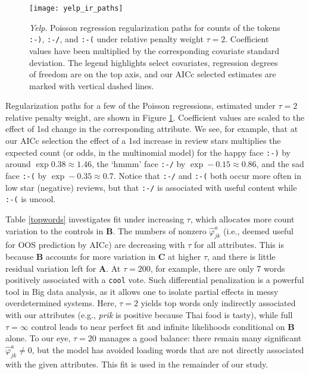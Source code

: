 \documentclass[12pt]{article}
\newcommand{\bm}[1]{\mathbf{#1}}
\newcommand{\cd}[1]{{\tt#1}}
\begin{document}
\begin{figure}[b!]
\hspace{-.25in}\texttt{[image: yelp\_ir\_paths]}
\caption{\label{yelp_ir} {\it Yelp}.  
Poisson regression regularization paths for counts of the tokens \cd{:-)},
\cd{:-/}, and
\cd{:-(} under relative penalty weight $\tau=2$.  Coefficient values have been
multiplied by the corresponding covariate standard deviation.  The legend
highlights select covariates, regression degrees of freedom are on the top
axis, and our AICc selected estimates are marked with vertical dashed lines. }
\end{figure}


Regularization paths for a few of the Poisson regressions, estimated under
$\tau=2$ relative penalty weight, are shown in Figure \ref{yelp_ir}.
Coefficient values are scaled to the effect of 1sd change in
the corresponding attribute. We see, for example, that at our AICc selection
the effect of a 1sd increase in review stars multiplies the expected count (or
odds, in the multinomial model) for the happy face
  \cd{:\!-\!)} by around $\exp 0.38 \approx 1.46$, the `hmmm' face \cd{:\!-\!/} by $\exp
  -0.15 \approx 0.86$, and the sad face \cd{:\!-\!(} by $\exp -0.35 \approx 0.7$.
 Notice that \cd{:\!-\!/} and \cd{:\!-\!(} both occur more often in low star
 (negative) reviews, but that \cd{:\!-\!/} is associated with useful content while
 \cd{:\!-\!(} is uncool.


Table \ref{topwords} investigates fit under increasing $\tau$, which allocates
more  count variation to the controls in $\bm{B}$.  The numbers of nonzero
$\hat\varphi^a_{jk}$  (i.e., deemed useful for OOS prediction by AICc) are
decreasing with $\tau$ for all attributes.  This is because $\bm{B}$ accounts
for more variation in $\bm{C}$ at higher $\tau$, and  there is little residual
variation left for $\bm{A}$.  At $\tau=200$, for example, there are only 7
words positively associated with a
\cd{cool} vote. Such differential penalization is a powerful tool in Big data
analysis,  as it allows one to isolate partial effects in messy overdetermined
systems.  Here, $\tau=2$ yields top words only indirectly
associated with our attributes (e.g., {\it prik} is positive because Thai food
is tasty), while  full $\tau=\infty$ control leads to near perfect fit and
infinite likelihoods conditional on $\bm{B}$ alone. To our eye, $\tau=20$
manages a good balance: there remain many significant
$\hat\varphi^a_{jk}\neq 0$, but the model has avoided loading  words that
are not directly associated with the given attributes.  This fit is used in
the remainder of our study.
\end{document}

